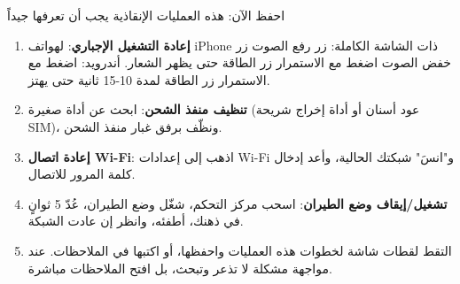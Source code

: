 \begin{tcbpractice}{احفظ الآن: هذه العمليات الإنقاذية يجب أن تعرفها جيداً}
\begin{enumerate}
  \item \textbf{إعادة التشغيل الإجباري}: لهواتف iPhone ذات الشاشة الكاملة: زر رفع الصوت زر خفض الصوت اضغط مع الاستمرار زر الطاقة حتى يظهر الشعار. أندرويد: اضغط مع الاستمرار زر الطاقة لمدة 10-15 ثانية حتى يهتز.
  \item \textbf{تنظيف منفذ الشحن}: ابحث عن أداة صغيرة (عود أسنان أو أداة إخراج شريحة SIM)، ونظّف برفق غبار منفذ الشحن.
  \item \textbf{إعادة اتصال Wi-Fi}: اذهب إلى إعدادات Wi-Fi و"انسَ" شبكتك الحالية، وأعد إدخال كلمة المرور للاتصال.
  \item \textbf{تشغيل/إيقاف وضع الطيران}: اسحب مركز التحكم، شغّل وضع الطيران، عُدّ 5 ثوانٍ في ذهنك، أطفئه، وانظر إن عادت الشبكة.
  \item التقط لقطات شاشة لخطوات هذه العمليات واحفظها، أو اكتبها في الملاحظات. عند مواجهة مشكلة لا تذعر وتبحث، بل افتح الملاحظات مباشرة.
\end{enumerate}

\end{tcbpractice}
